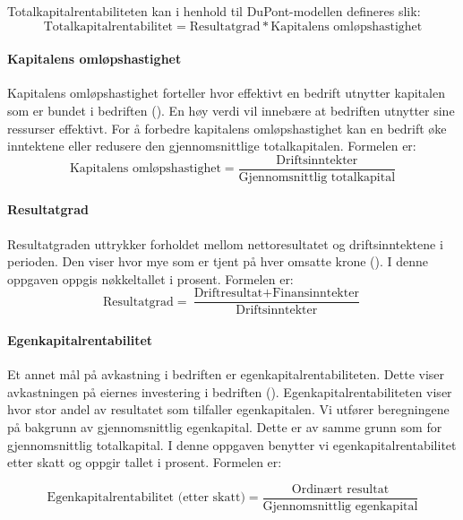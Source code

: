 Totalkapitalrentabiliteten kan i henhold til DuPont-modellen defineres slik:
\begin{equation}
    \label{eq:ROI2}
    \boxed{\text{Totalkapitalrentabilitet}=\text{Resultatgrad} * \text{Kapitalens omløpshastighet}}
\end{equation}

\paragraph{Kapitalens omløpshastighet}
Kapitalens omløpshastighet forteller hvor effektivt en bedrift utnytter kapitalen som er bundet i bedriften (\cite{kristoffersen}). En høy verdi vil innebære at bedriften utnytter sine ressurser effektivt. For å forbedre kapitalens omløpshastighet kan en bedrift øke inntektene eller redusere den gjennomsnittlige totalkapitalen. Formelen er:
\begin{equation}
    \label{eq:KO}
    \boxed{\text{Kapitalens omløpshastighet}=\frac{\text{Driftsinntekter}}{\text{Gjennomsnittlig totalkapital}}}
\end{equation}

\paragraph{Resultatgrad}
Resultatgraden uttrykker forholdet mellom nettoresultatet og driftsinntektene i perioden. Den viser hvor mye som er tjent på hver omsatte krone (\cite{kristoffersen}). I denne oppgaven oppgis nøkkeltallet i prosent. Formelen er:
\begin{equation}
    \label{eq:RG}
    \boxed{\text{Resultatgrad}=\frac{\text{Driftresultat}+\text{Finansinntekter}}{\text{Driftsinntekter}}}
\end{equation}

\paragraph{Egenkapitalrentabilitet}
Et annet mål på avkastning i bedriften er egenkapitalrentabiliteten. Dette viser avkastningen på eiernes investering i bedriften (\cite{kristoffersen}). Egenkapitalrentabiliteten viser hvor stor andel av resultatet som tilfaller egenkapitalen. Vi utfører beregningene på bakgrunn av gjennomsnittlig egenkapital. Dette er av samme grunn som for gjennomsnittlig totalkapital.
I denne oppgaven benytter vi egenkapitalrentabilitet etter skatt og oppgir tallet i prosent.
Formelen er:

\begin{equation}
    \label{eq:EKR}
    \boxed{\text{Egenkapitalrentabilitet (etter skatt)}=\frac{\text{Ordinært resultat}}{\text{Gjennomsnittlig egenkapital}}}
\end{equation}

